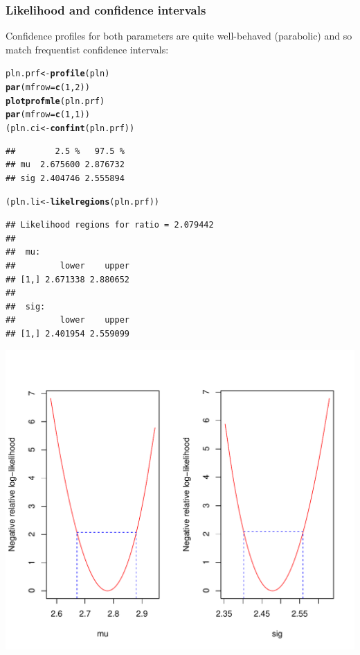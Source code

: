 \documentclass[12pt, A4]{article}\usepackage[]{graphicx}\usepackage[]{color}
\makeatletter
\def\maxwidth{ %
  \ifdim\Gin@nat@width>\linewidth
    \linewidth
  \else
    \Gin@nat@width
  \fi
}
\newcommand{\hlnum}[1]{\textcolor[rgb]{0.686,0.059,0.569}{#1}}%
\newcommand{\hlstd}[1]{\textcolor[rgb]{0.345,0.345,0.345}{#1}}%
\newcommand{\hlkwb}[1]{\textcolor[rgb]{0.69,0.353,0.396}{#1}}%
\newcommand{\hlkwc}[1]{\textcolor[rgb]{0.333,0.667,0.333}{#1}}%
\newcommand{\hlkwd}[1]{\textcolor[rgb]{0.737,0.353,0.396}{\textbf{#1}}}%
\newenvironment{kframe}{%
 \def\at@end@of@kframe{}%
 \ifinner\ifhmode%
  \def\at@end@of@kframe{\end{minipage}}%
  \begin{minipage}{\columnwidth}%
 \fi\fi%
 \def\FrameCommand##1{\hskip\@totalleftmargin \hskip-\fboxsep
 \colorbox{shadecolor}{##1}\hskip-\fboxsep
     \hskip-\linewidth \hskip-\@totalleftmargin \hskip\columnwidth}%
 \MakeFramed {\advance\hsize-\width
   \@totalleftmargin\z@ \linewidth\hsize
   \@setminipage}}%
 {\par\unskip\endMakeFramed%
 \at@end@of@kframe}
\newenvironment{knitrout}{}{} %
\makeatother
\begin{document}
\subsubsection*{Likelihood and confidence intervals}

Confidence profiles for both parameters are quite well-behaved (parabolic)
and so match frequentist confidence intervals:

\begin{knitrout}
\color{fgcolor}\begin{kframe}
\begin{alltt}
\hlstd{pln.prf} \hlkwb{<-} \hlkwd{profile}\hlstd{(pln)}
\hlkwd{par}\hlstd{(}\hlkwc{mfrow}\hlstd{=}\hlkwd{c}\hlstd{(}\hlnum{1}\hlstd{,}\hlnum{2}\hlstd{))}
\hlkwd{plotprofmle}\hlstd{(pln.prf)}
\hlkwd{par}\hlstd{(}\hlkwc{mfrow}\hlstd{=}\hlkwd{c}\hlstd{(}\hlnum{1}\hlstd{,}\hlnum{1}\hlstd{))}
\hlstd{(pln.ci} \hlkwb{<-} \hlkwd{confint}\hlstd{(pln.prf))}
\end{alltt}
\begin{verbatim}
##        2.5 %   97.5 %
## mu  2.675600 2.876732
## sig 2.404746 2.555894
\end{verbatim}
\begin{alltt}
\hlstd{(pln.li} \hlkwb{<-} \hlkwd{likelregions}\hlstd{(pln.prf))}
\end{alltt}
\begin{verbatim}
## Likelihood regions for ratio = 2.079442 
## 
##  mu:
##         lower    upper
## [1,] 2.671338 2.880652
## 
##  sig:
##         lower    upper
## [1,] 2.401954 2.559099
\end{verbatim}
\end{kframe}

{\centering \includegraphics[width=\maxwidth]{figure/confindence_and_likelihood_limits_of_PLN-1} 

}



\end{knitrout}
\end{document}

